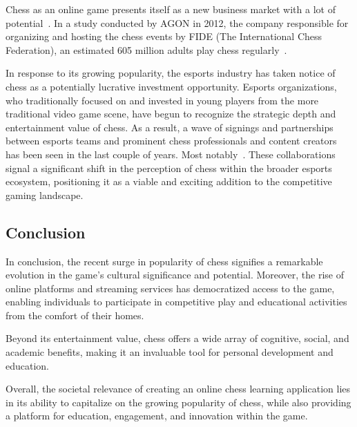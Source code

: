 Chess as an online game presents itself as a new business market with a lot of
potential~\cite{business-insider2021}.
In a study conducted by AGON in 2012, the company responsible for organizing and hosting the chess events by FIDE (The
International Chess Federation), an estimated 605 million adults play chess regularly~\cite{chessbase2012}.

In response to its growing popularity, the esports industry has taken notice of chess as a potentially lucrative
investment opportunity.
Esports organizations, who traditionally focused on and invested in young players from the more traditional video game
scene, have begun to recognize the strategic depth and entertainment value of chess.
As a result, a wave of signings and partnerships between esports teams and prominent chess professionals and content
creators has been seen in the last couple of years.
Most notably~.
These collaborations signal a significant shift in the perception of chess within the broader esports ecosystem,
positioning it as a viable and exciting addition to the competitive gaming landscape.


\subsection{Conclusion}\label{subsec:conclusion}

In conclusion, the recent surge in popularity of chess signifies a remarkable evolution in the game's cultural
significance and potential.
Moreover, the rise of online platforms and streaming services has democratized access to the game, enabling individuals
to participate in competitive play and educational activities from the comfort of their homes.

Beyond its entertainment value, chess offers a wide array of cognitive, social, and academic benefits, making it an
invaluable tool for personal development and education.

Overall, the societal relevance of creating an online chess learning application lies in its ability to capitalize on
the growing popularity of chess, while also providing a platform for education, engagement, and innovation within the
game.
